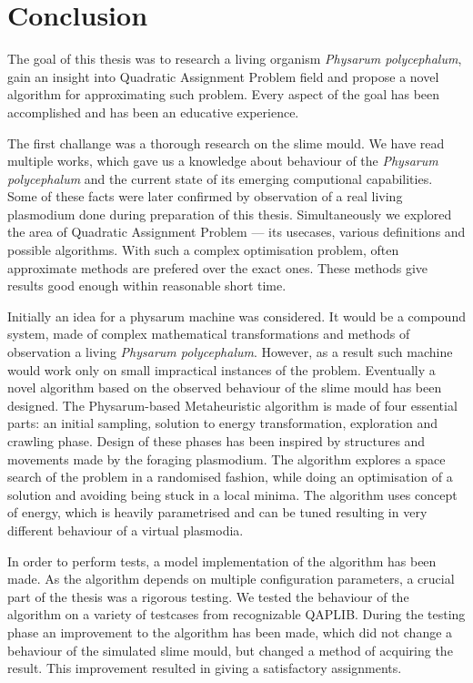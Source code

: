 \chapter{Conclusion}
\label{chapter:conclusion}

The goal of this thesis was to research a living organism \textit{Physarum polycephalum}, gain an insight into Quadratic Assignment Problem field and propose a novel algorithm for approximating such problem. Every aspect of the goal has been accomplished and has been an educative experience.

The first challange was a thorough research on the slime mould. We have read multiple works, which gave us a knowledge about behaviour of the \textit{Physarum polycephalum} and the current state of its emerging computional capabilities. Some of these facts were later confirmed by observation of a real living plasmodium done during preparation of this thesis. Simultaneously we explored the area of Quadratic Assignment Problem --- its usecases, various definitions and possible algorithms. With such a complex optimisation problem, often approximate methods are prefered over the exact ones. These methods give results good enough within reasonable short time.

Initially an idea for a physarum machine was considered. It would be a compound system, made of complex mathematical transformations and methods of observation a living \textit{Physarum polycephalum}. However, as a result such machine would work only on small impractical instances of the problem. Eventually a novel algorithm based on the observed behaviour of the slime mould has been designed. The Physarum-based Metaheuristic algorithm is made of four essential parts: an initial sampling, solution to energy transformation, exploration and crawling phase. Design of these phases has been inspired by structures and movements made by the foraging plasmodium. The algorithm explores a space search of the problem in a randomised fashion, while doing an optimisation of a solution and avoiding being stuck in a local minima. The algorithm uses concept of energy, which is heavily parametrised and can be tuned resulting in very different behaviour of a virtual plasmodia.

In order to perform tests, a model implementation of the algorithm has been made. As the algorithm depends on multiple configuration parameters, a crucial part of the thesis was a rigorous testing. We tested the behaviour of the algorithm on a variety of testcases from recognizable QAPLIB. During the testing phase an improvement to the algorithm has been made, which did not change a behaviour of the simulated slime mould, but changed a method of acquiring the result. This improvement resulted in giving a satisfactory assignments.

